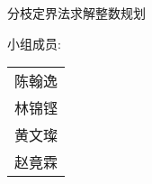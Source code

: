 \begin{center}\large\bfseries
	\vspace*{\fill}
	{\Huge{分枝定界法求解整数规划}
	\vspace{5ex}
	
	{
		\huge{小组成员: \\}
		\large
		\begin{tabular}{c}
			\\
			陈翰逸 \\
			林锦铿 \\
			黄文璨 \\
			赵竟霖
		\end{tabular}}
	}	
	
	\vspace*{\fill}
\end{center}
\thispagestyle{empty}